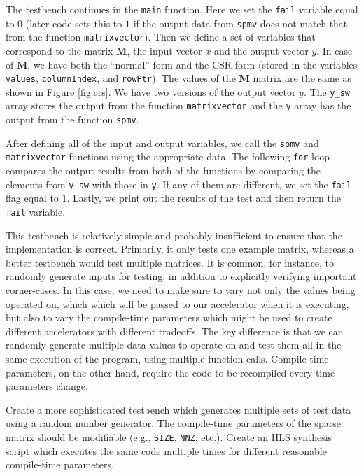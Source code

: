 The testbench continues in the \lstinline{main} function. Here we set the \lstinline{fail} variable equal to $0$ (later code sets this to $1$ if the output data from \lstinline{spmv} does not match that from the function \lstinline{matrixvector}). Then we define a set of variables that correspond to the matrix $\mathbf{M}$, the input vector $x$ and the output vector $y$. In case of $\mathbf{M}$, we have both the ``normal'' form and the CSR form (stored in the variables \lstinline{values}, \lstinline{columnIndex}, and \lstinline{rowPtr}). The values of the $\mathbf{M}$ matrix are the same as shown in Figure \ref{fig:crs}. We have two versions of the output vector $y$. The \lstinline{y_sw} array stores the output from the function \lstinline{matrixvector} and the \lstinline{y} array has the output from the function \lstinline{spmv}. 

After defining all of the input and output variables, we call the \lstinline{spmv} and \lstinline{matrixvector} functions using the appropriate data. The following \lstinline{for} loop compares the output results from both of the functions by comparing the elements from \lstinline{y_sw} with those in \lstinline{y}. If any of them are different, we set the \lstinline{fail} flag equal to $1$. Lastly, we print out the results of the test and then return the \lstinline{fail} variable. 

This testbench is relatively simple and probably insufficient to ensure that the implementation is correct.  Primarily, it only tests one example matrix, whereas a better testbench would test multiple matrices.  It is common, for instance, to randomly generate inputs for testing, in addition to explicitly verifying important corner-cases.   In this case, we need to make sure to vary not only the values being operated on, which which will be passed to our accelerator when it is executing, but also to vary the compile-time parameters which might be used to create different accelerators with different tradeoffs.  The key difference is that we can randomly generate multiple data values to operate on and test them all in the same execution of the program, using multiple function calls.   Compile-time parameters, on the other hand, require the code to be recompiled every time parameters change.

\begin{exercise}
Create a more sophisticated testbench which generates multiple sets of test data using a random number generator. The compile-time parameters of the sparse matrix should be modifiable (e.g., \lstinline{SIZE}, \lstinline{NNZ}, etc.).  Create an HLS synthesis script which executes the same code multiple times for different reasonable compile-time parameters.
\end{exercise}

